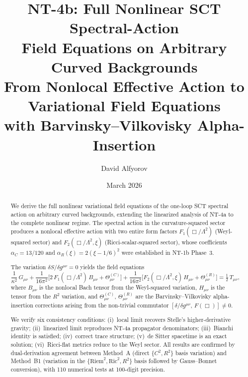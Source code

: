 \documentclass[11pt,a4paper]{article}
\title{NT-4b: Full Nonlinear SCT Spectral-Action\\
Field Equations on Arbitrary Curved Backgrounds\\[6pt]
\large From Nonlocal Effective Action to Variational Field Equations\\
with Barvinsky--Vilkovisky Alpha-Insertion}
\author{David Alfyorov}
\date{March 2026}
\theoremstyle{plain}
\theoremstyle{definition}
\begin{document}
\maketitle

\begin{center}
\end{center}

\begin{abstract}
We derive the full nonlinear variational field equations of the one-loop
SCT spectral action on arbitrary curved backgrounds, extending the
linearized analysis of NT-4a to the complete nonlinear regime. The
spectral action in the curvature-squared sector produces a nonlocal
effective action with two entire form factors $F_1(\Box/\Lambda^2)$
(Weyl-squared sector) and $F_2(\Box/\Lambda^2,\xi)$ (Ricci-scalar-squared
sector), whose coefficients $\alpha_C = 13/120$ and
$\alpha_R(\xi) = 2(\xi - 1/6)^2$ were established in NT-1b Phase~3.

The variation $\delta S / \delta g^{\mu\nu} = 0$ yields the field
equations
\begin{equation*}
  \frac{1}{\kappa^2}\,G_{\mu\nu}
  + \frac{1}{16\pi^2}\bigl[2\,F_1(\Box/\Lambda^2)\,B_{\mu\nu}
    + \Theta^{(C)}_{\mu\nu}\bigr]
  + \frac{1}{16\pi^2}\bigl[F_2(\Box/\Lambda^2,\xi)\,H_{\mu\nu}
    + \Theta^{(R)}_{\mu\nu}\bigr]
  = \tfrac{1}{2}\,T_{\mu\nu},
\end{equation*}
where $B_{\mu\nu}$ is the nonlocal Bach tensor from the Weyl-squared
variation, $H_{\mu\nu}$ is the tensor from the $R^2$ variation,
and $\Theta^{(C)}_{\mu\nu}$, $\Theta^{(R)}_{\mu\nu}$ are the
Barvinsky--Vilkovisky alpha-insertion corrections arising from the
non-trivial commutator $[\delta/\delta g^{\mu\nu},\, F(\Box)] \neq 0$.

We verify six consistency conditions: (i)~local limit recovers Stelle's
higher-derivative gravity; (ii)~linearized limit reproduces NT-4a
propagator denominators; (iii)~Bianchi identity is satisfied;
(iv)~correct trace structure; (v)~de Sitter spacetime is an exact
solution; (vi)~Ricci-flat metrics reduce to the Weyl sector.
All results are confirmed by dual-derivation agreement between Method~A
(direct $\{C^2,R^2\}$ basis variation) and Method~B1 (variation in the
$\{\mathrm{Riem}^2,\mathrm{Ric}^2,R^2\}$ basis followed by
Gauss--Bonnet conversion), with 110 numerical tests at 100-digit precision.
\end{abstract}

\tableofcontents

\end{document}
